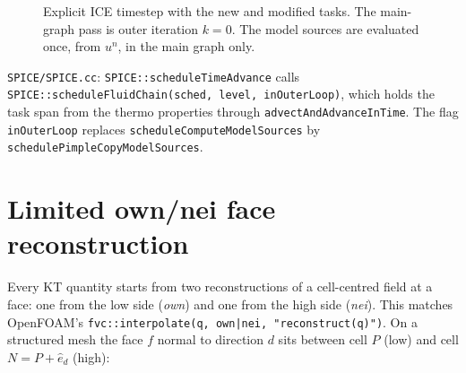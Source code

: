 \documentclass[11pt]{article}
\newcommand{\code}[1]{\texttt{\small #1}}
\newcommand{\file}[1]{\texttt{\small\color{Moss}#1}}
\begin{document}
\begin{figure}[ht]
\caption{Explicit ICE timestep with the new and modified tasks. The main-graph pass is outer
iteration $k=0$. The model sources are evaluated once, from $u^n$, in the main graph only.}
\label{fig:flow}
\end{figure}

\begin{incode}
\file{SPICE/SPICE.cc}: \code{SPICE::scheduleTimeAdvance} calls \code{SPICE::scheduleFluidChain(sched,
level, inOuterLoop)}, which holds the task span from the thermo properties through
\code{advectAndAdvanceInTime}. The flag \code{inOuterLoop} replaces
\code{scheduleComputeModelSources} by \code{schedulePimpleCopyModelSources}.
\end{incode}

\section{Limited own/nei face reconstruction}\label{sec:recon}

Every KT quantity starts from two reconstructions of a cell-centred field at a face: one
from the low side (\emph{own}) and one from the high side (\emph{nei}). This matches OpenFOAM's
\code{fvc::interpolate(q, own|nei, "reconstruct(q)")}. On a structured mesh the face
$f$ normal to direction $d$ sits between cell $P$ (low) and cell $N=P+\hat e_d$ (high):
\end{document}
